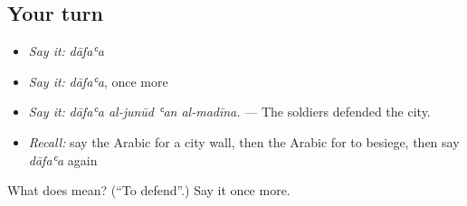 \subsection*{Your turn}
\begin{itemize}
\raggedright
  \item \emph{Say it:} \emph{dāfaʿa}
  \item \emph{Say it:} \emph{dāfaʿa}, once more
  \item \emph{Say it:} \emph{dāfaʿa al-junūd ʿan al-madīna.} — The soldiers defended the city.
  \item \emph{Recall:} say the Arabic for a city wall, then the Arabic for to besiege, then say \emph{dāfaʿa} again
\end{itemize}

\begin{tcolorbox}[breakable,colback=teal!4,colframe=teal!35!black,title={Before you move on}]
What does  mean? (\textquotedblleft{}To defend\textquotedblright{}.) Say it once more.
\end{tcolorbox}

